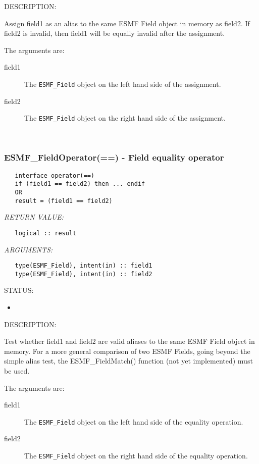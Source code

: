 {\sf DESCRIPTION:\\ }


   Assign field1 as an alias to the same ESMF Field object in memory
   as field2. If field2 is invalid, then field1 will be equally invalid after
   the assignment.
  
   The arguments are:
   \begin{description}
   \item[field1]
   The {\tt ESMF\_Field} object on the left hand side of the assignment.
   \item[field2]
   The {\tt ESMF\_Field} object on the right hand side of the assignment.
   \end{description}
   
 
\mbox{}\hrulefill\ 
 
\subsubsection [ESMF\_FieldOperator(==)] {ESMF\_FieldOperator(==) - Field equality operator}


  
\begin{verbatim}   interface operator(==)
   if (field1 == field2) then ... endif
   OR
   result = (field1 == field2)\end{verbatim}{\em RETURN VALUE:}
\begin{verbatim}   logical :: result\end{verbatim}{\em ARGUMENTS:}
\begin{verbatim}   type(ESMF_Field), intent(in) :: field1
   type(ESMF_Field), intent(in) :: field2\end{verbatim}
{\sf STATUS:}
   \begin{itemize}
   \item{}
   \end{itemize}
  
{\sf DESCRIPTION:\\ }


   Test whether field1 and field2 are valid aliases to the same ESMF
   Field object in memory. For a more general comparison of two ESMF Fields,
   going beyond the simple alias test, the ESMF\_FieldMatch() function (not yet
   implemented) must be used.
  
   The arguments are:
   \begin{description}
   \item[field1]
   The {\tt ESMF\_Field} object on the left hand side of the equality
   operation.
   \item[field2]
   The {\tt ESMF\_Field} object on the right hand side of the equality
   operation.
   \end{description}
   

